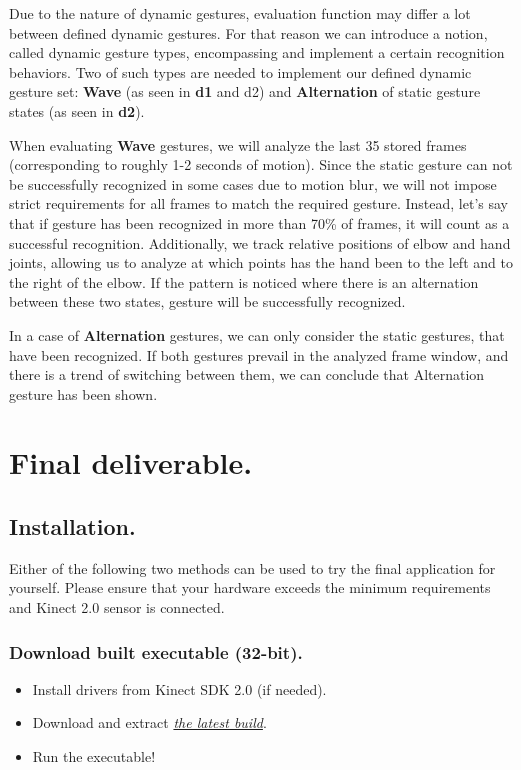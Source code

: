 \documentclass[a4paper,11pt,oneside]{article}
\begin{document}
Due to the nature of dynamic gestures, evaluation function may differ a lot between defined dynamic gestures. For that reason we can introduce a notion, called dynamic gesture types, encompassing and implement a certain recognition behaviors. Two of such types are needed to implement our defined dynamic gesture set: \textbf{Wave} (as seen in \textbf{d1} and {d2}) and \textbf{Alternation} of static gesture states (as seen in \textbf{d2}). 

When evaluating \textbf{Wave} gestures, we will analyze the last 35 stored frames (corresponding to roughly 1-2 seconds of motion). Since the static gesture can not be successfully recognized in some cases due to motion blur, we will not impose strict requirements for all frames to match the required gesture. Instead, let's say that if gesture has been recognized in more than 70\% of frames, it will count as a successful recognition. Additionally, we track relative positions of elbow and hand joints, allowing us to analyze at which points has the hand been to the left and to the right of the elbow. If the pattern is noticed where there is an alternation between these two states, gesture will be successfully recognized.

In a case of \textbf{Alternation} gestures, we can only consider the static gestures, that have been recognized. If both gestures prevail in the analyzed frame window, and there is a trend of switching between them, we can conclude that Alternation gesture has been shown.

\section{Final deliverable.}

\subsection{Installation.}

Either of the following two methods can be used to try the final application for yourself. Please ensure that your hardware exceeds the minimum requirements and Kinect 2.0 sensor is connected.

\subsubsection{Download built executable (32-bit).}

\begin{itemize}
\item Install drivers from Kinect SDK 2.0 (if needed).
\item Download and extract \href{https://github.com/dmitryfd/KinectGR}{\textit{the latest build}}.
\item Run the executable!
\end{itemize}
\end{document}
